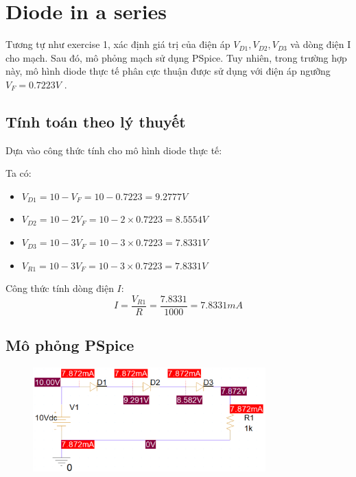 \section{Diode in a series}

Tương tự như exercise 1, xác định giá trị của điện áp \(V_{D1}, V_{D2}, V_{D3}\) và dòng điện I cho mạch. Sau đó, mô phỏng mạch sử dụng PSpice. Tuy nhiên, trong trường hợp này, mô hình diode thực tế phân cực thuận được sử dụng với điện áp ngưỡng \(V_{F} = 0.7223V\) .

\subsection{Tính toán theo lý thuyết}   

Dựa vào công thức tính cho mô hình diode thực tế:
    
    Ta có: 
\begin{itemize}
    
    \item \(V_{D1} = 10 - V_{F} = 10 - 0.7223 = 9.2777V\)

    \item \(V_{D2} = 10 - 2V_{F} = 10 - 2 \times 0.7223 = 8.5554 V\)

    \item \(V_{D3} = 10 - 3V_{F} = 10 - 3 \times 0.7223 = 7.8331 V\)
    
    \item \(V_{R1} = 10 - 3V_{F} = 10 - 3 \times 0.7223 = 7.8331 V\)
    
\end{itemize}

Công thức tính dòng điện \(I\):
\[
    I = \frac{V_{R1}}{R} = \frac{7.8331}{1000} = 7.8331 mA
\]
\subsection{Mô phỏng PSpice}

\begin{figure}[!htbp]
    \centering
    \includegraphics[width=0.8\textwidth]{graphics/ex2/f1.png}
\end{figure}

